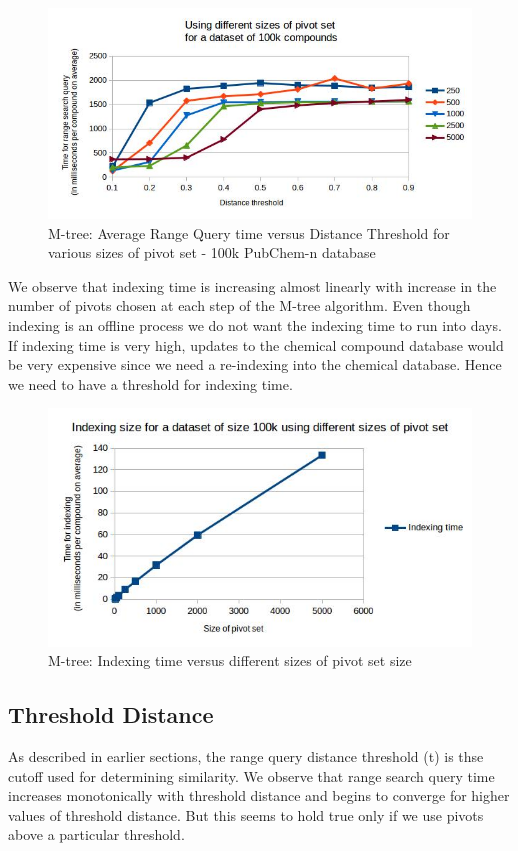 \begin{figure}[ht!]	
\centering
\includegraphics[width=1 \columnwidth]{img/image4.jpg}
\caption{M-tree: Average Range Query time versus Distance Threshold for various sizes of pivot set - 100k PubChem-n database}
\label{fig:5.5}
\end{figure}


We observe that indexing time is increasing almost linearly with increase in the number of pivots chosen at each step of the M-tree algorithm. Even though indexing is an offline process we do not want the indexing time to run into days. If indexing time is very high, updates to the chemical compound database would be very expensive since we need a re-indexing into the chemical database. Hence we need to have a threshold for indexing time.

\begin{figure}[ht!]	
\centering
\includegraphics[width=1 \columnwidth]{img/image7.jpg}
\caption{M-tree: Indexing time versus different sizes of pivot set size}
\label{fig:5.6}
\end{figure}



\subsection{Threshold Distance}
As described in earlier sections, the range query distance threshold (t) is thse cutoff used for determining similarity. We observe that range search query time increases monotonically with threshold distance and begins to converge for higher values of threshold distance.  But this seems to hold true only if we use pivots above a particular threshold. 

